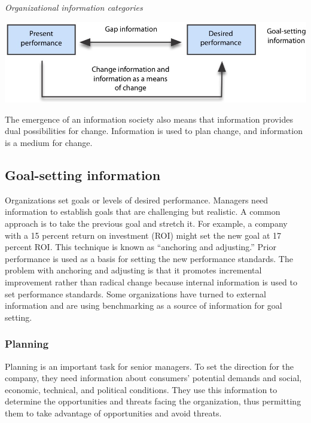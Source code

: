 \documentclass[
]{article}
\begin{document}
\emph{Organizational information categories}

\includegraphics{Figures/Chapter 2/gap model.jpg}

The emergence of an information society also means that information
provides dual possibilities for change. Information is used to plan
change, and information is a medium for change.

\hypertarget{goal-setting-information}{%
\subsection*{Goal-setting information}\label{goal-setting-information}}

Organizations set goals or levels of desired performance. Managers need
information to establish goals that are challenging but realistic. A
common approach is to take the previous goal and stretch it. For
example, a company with a 15 percent return on investment (ROI) might
set the new goal at 17 percent ROI. This technique is known as
``anchoring and adjusting.'' Prior performance is used as a basis for
setting the new performance standards. The problem with anchoring and
adjusting is that it promotes incremental improvement rather than
radical change because internal information is used to set performance
standards. Some organizations have turned to external information and
are using benchmarking as a source of information for goal setting.

\hypertarget{planning}{%
\subsubsection*{Planning}\label{planning}}

Planning is an important task for senior managers. To set the direction
for the company, they need information about consumers' potential
demands and social, economic, technical, and political conditions. They
use this information to determine the opportunities and threats facing
the organization, thus permitting them to take advantage of
opportunities and avoid threats.
\end{document}
